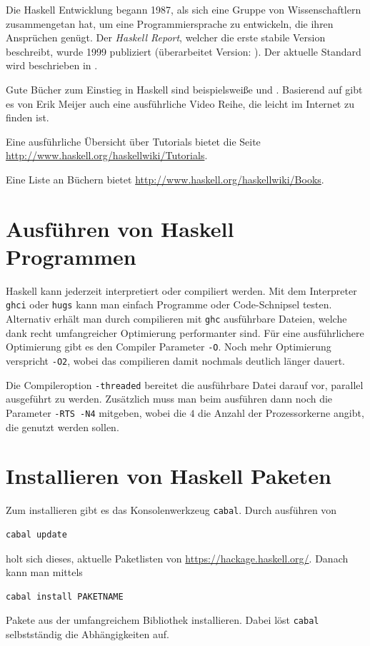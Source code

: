 Die Haskell Entwicklung begann 1987, als sich eine Gruppe von Wissenschaftlern
zusammengetan hat, um eine Programmiersprache zu entwickeln, die ihren
Ansprüchen genügt. Der \emph{Haskell Report}, welcher die erste stabile Version
beschreibt, wurde 1999 publiziert (überarbeitet Version: \cite{haskell98}).
Der aktuelle Standard wird beschrieben in \cite{haskell2010}.

Gute Bücher zum Einstieg in Haskell sind beispielsweiße \cite{Hutton} und
\cite{lyahfgg}. Basierend auf \cite{Hutton} gibt es von Erik Meijer auch eine
ausführliche Video Reihe, die leicht im Internet zu finden ist.

Eine ausführliche Übersicht über Tutorials bietet die Seite
\url{http://www.haskell.org/haskellwiki/Tutorials}.

Eine Liste an Büchern bietet \url{http://www.haskell.org/haskellwiki/Books}.

\section{Ausführen von Haskell Programmen}

Haskell kann jederzeit interpretiert oder compiliert werden. Mit dem
Interpreter \texttt{ghci} oder \texttt{hugs} kann man einfach Programme oder
Code-Schnipsel testen.
Alternativ erhält man durch compilieren mit \texttt{ghc} ausführbare Dateien,
welche dank recht umfangreicher Optimierung performanter sind. Für eine
ausführlichere Optimierung gibt es den Compiler Parameter \texttt{-O}. Noch
mehr Optimierung verspricht \texttt{-O2}, wobei das compilieren damit
nochmals deutlich länger dauert.

Die Compileroption \texttt{-threaded} bereitet die ausführbare Datei darauf
vor, parallel ausgeführt zu werden. Zusätzlich muss man beim ausführen dann
noch die Parameter \texttt{-RTS -N4} mitgeben, wobei die $4$ die Anzahl der
Prozessorkerne angibt, die genutzt werden sollen.

\section{Installieren von Haskell Paketen}
Zum installieren gibt es das Konsolenwerkzeug \texttt{cabal}. Durch ausführen
von 
\begin{lstlisting}[language=bash ,numbers=none ,backgroundcolor=\color{lightgray}]
cabal update
\end{lstlisting}
holt sich dieses, aktuelle Paketlisten von
\url{https://hackage.haskell.org/}. Danach kann man mittels
\begin{lstlisting}[language=bash ,numbers=none ,backgroundcolor=\color{lightgray}]
cabal install PAKETNAME
\end{lstlisting}
Pakete aus der umfangreichem Bibliothek installieren.
Dabei löst \texttt{cabal} selbstständig die Abhängigkeiten auf.

